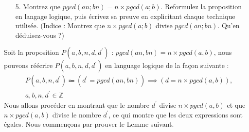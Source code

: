 \documentclass[16pt]{report}
\begin{document}
\begin{multicols*}{2}
    \begin{enumerate}
        \item[5.] Montrez que $pgcd(an; bn) = n \times pgcd(a; b)$. Reformulez la proposition en langage
        logique, puis écrivez sa preuve en explicitant chaque technique utilisée.
        (Indice : Montrez que $n \times pgcd(a; b)$ divise $pgcd(an; bn)$. Qu’en déduisez-vous ?)
    \end{enumerate}

    Soit la proposition $P(a,b,n,d, d^{\prime})$ : $pgcd(an, bn) = n \times pgcd(a,b)$, nous 
    pouvons réécrire $P(a,b,n,d, d^{\prime})$ en language logique de la façon suivante :
    \begin{align*}
        &P(a,b,n,d^{\prime})  \Coloneqq \left(d^{\prime} = pgcd(an,bn)\right) 
        \implies \left( d = n \times pgcd(a,b) \right), \\ 
        &a,b,n, d^{\prime} \in \mathbb{Z}
    \end{align*} 
    Nous allons procéder en montrant que le nombre $d^{\prime}$ divise $n \times pgcd(a,b)$ et que 
    $n \times pgcd(a,b)$ divise le nombre $d^{\prime}$, ce qui montre que les deux expressions sont 
    égales. Nous commençons par prouver le Lemme suivant. 


\end{multicols*}
\end{document}

